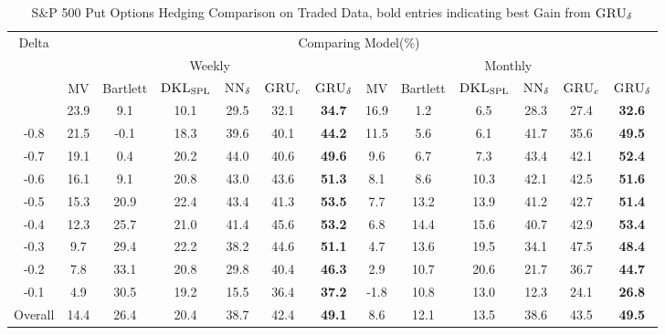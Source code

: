 \documentclass[letterpaper,12pt,titlepage,oneside,final]{book}
\numberwithin{equation}{section}
\theoremstyle{definition}
\newcommand{\model}{\textsc{GRU}_\delta}
\newcommand{\modelN}{\textsc{NN}_\delta}
\newcommand{\DKLs}{\bf\textsc{DKL}_{\text{SPL}}}
\begin{document}
\begin{table}[htp!]
	\centering
	\small
	\begin{threeparttable}
		\begin{tabular}{|c|cccccc| cccccc|}
			\hline
			\multirow{4}{*}{Delta}&\multicolumn{12}{c|}{Comparing Model(\%)}\\
			&\multicolumn{6}{c}{Weekly }&\multicolumn{6}{c|}{Monthly}\\ %
			&{\tiny MV}& {\tiny Bartlett}&\multicolumn{1}{c}{\tiny $\DKLs$}
			&\multicolumn{1}{c}{\tiny $\modelN$ } &\multicolumn{1}{c}{\tiny $\textsc{GRU}_{c}$} &\multicolumn{1}{c}{\tiny $\model$}
            &{\tiny MV}& {\tiny Bartlett} &\multicolumn{1}{c}{\tiny $\DKLs$}
            &\multicolumn{1}{c}{\tiny $\modelN$} &\multicolumn{1}{c}{\tiny $\textsc{GRU}_{c}$} & \multicolumn{1}{c|}{\tiny $\model$ } \\ \hline
			-0.9   &23.9  &9.1  &10.1   &29.5 &32.1 &\textbf{34.7}  &16.9 &1.2 &6.5   &28.3         & 27.4& \textbf{32.6}  \\

			-0.8   &21.5  &-0.1 &18.3   &39.6 &40.1 &\textbf{44.2}  &11.5 &5.6 &6.1   &41.7        &35.6 & \textbf{49.5}  \\

			-0.7   &19.1  &0.4  &20.2   &44.0 &40.6 &\textbf{49.6}  &9.6  &6.7 &7.3   &43.4        &42.1 & \textbf{52.4}  \\
			-0.6   &16.1  &9.1  &20.8   &43.0 &43.6 &\textbf{51.3}  &8.1  &8.6 &10.3  &42.1        &42.5 & \textbf{51.6}  \\
			-0.5   &15.3  &20.9 &22.4   &43.4&41.3 &\textbf{53.5}  &7.7  &13.2 &13.9  &41.2        &42.7 & \textbf{51.4}  \\
			-0.4   &12.3  &25.7 &21.0   &41.4&45.6 &\textbf{53.2}  &6.8  &14.4 &15.6  &40.7        &42.9 & \textbf{53.4}  \\
			-0.3   &9.7   &29.4 &22.2   &38.2&44.6 &\textbf{51.1}  &4.7  &13.6 &19.5  &34.1       &47.5  & \textbf{48.4}  \\
			-0.2   &7.8   &33.1 &20.8   &29.8 &40.4&\textbf{46.3}  &2.9  &10.7 &20.6  &21.7         & 36.7 &\textbf{44.7}  \\
			-0.1   &4.9   &30.5 &19.2   &15.5&36.4 &\textbf{37.2}  &-1.8 &10.8 &13.0  &12.3         &24.1& \textbf{26.8}  \\
			Overall&14.4  &26.4 &20.4   &38.7 &42.4&\textbf{49.1}  &8.6  &12.1 &13.5  &38.6        &43.5 & \textbf{49.5}  \\
			\hline
		\end{tabular}
		\caption{S\&P 500 Put Options Hedging Comparison on Traded Data, bold entries indicating best Gain from $\model$}
\label{SP500PutC}
\end{threeparttable}
\end{table}
\end{document}
